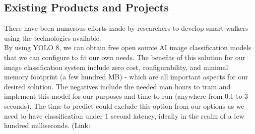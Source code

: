 \subsection{Existing Products and Projects}
\noindent There have been numerous efforts made by researchers to develop smart walkers using the technologies available.\\

\noindent By using YOLO 8, we can obtain free open source AI image classification models that we can configure to fit our own needs. The benefits of this solution for our image classification system include zero cost, configurability, and minimal memory footprint (a few hundred MB) - which are all important aspects for our desired solution. The negatives include the needed man hours to train and implement this model for our purposes and time to run (anywhere from 0.1 to 3 seconds). The time to predict could exclude this option from our options as we need to have classification under 1 second latency, ideally in the realm of a few hundred milliseconds.
(Link: %
\newline 
